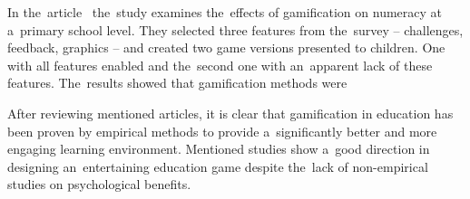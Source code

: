 In the~article~\cite{nand_2019_engaging} the~study examines the~effects of gamification on numeracy at a~primary school level.
They selected three features from the~survey -- challenges, feedback, graphics -- and created two game versions presented to children.
One with all features enabled and the~second one with an~apparent lack of these features.
The~results showed that gamification methods were 

After reviewing mentioned articles, it is clear that gamification in education has been proven by empirical methods to provide a~significantly better and more engaging learning environment.
Mentioned studies show a~good direction in designing an~entertaining education game despite the~lack of non-empirical studies on psychological benefits.
